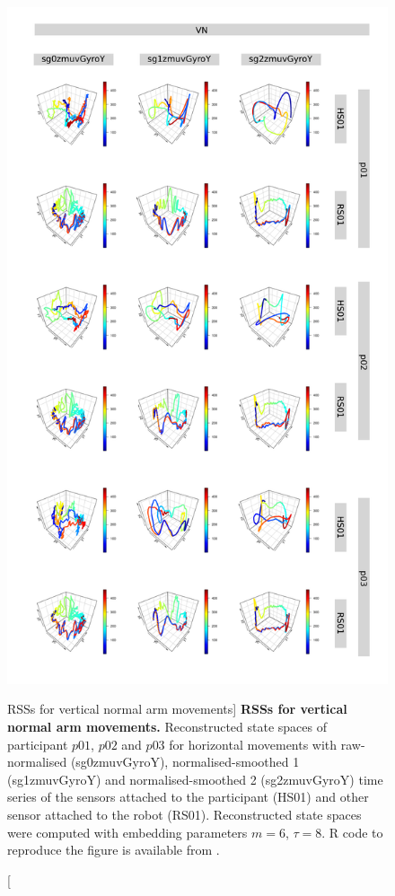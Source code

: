 \begin{figure}
\centering
\includegraphics[height=0.85\textheight]{rss_VN}
\caption
	[RSSs for vertical normal arm movements]{
	{\bf RSSs for vertical normal arm movements.}
	Reconstructed state spaces %
	of participant $p01$, $p02$ and $p03$ for horizontal movements 
	with raw-normalised (sg0zmuvGyroY), 
	normalised-smoothed 1 (sg1zmuvGyroY) and 
	normalised-smoothed 2 (sg2zmuvGyroY) time series of the 
	sensors attached to the participant (HS01) and other sensor 
	attached to the robot (RS01).	
	Reconstructed state spaces were computed with 
	embedding parameters $m=6$, $\tau=8$.
	R code to reproduce the figure is available from \cite{xochicale2018}.
        }
    \label{fig:rss_VN}
\end{figure}

